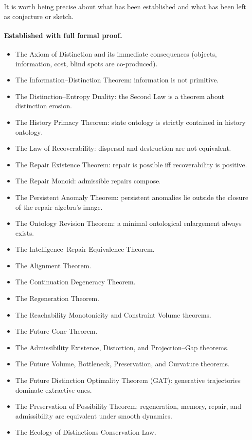\documentclass[12pt,twoside,openright]{book}
\begin{document}
It is worth being precise about what has been established
and what has been left as conjecture or sketch.

\paragraph{Established with full formal proof.}
\begin{itemize}
  \item The Axiom of Distinction and its immediate
        consequences (objects, information, cost, blind
        spots are co-produced).
  \item The Information--Distinction Theorem:
        information is not primitive.
  \item The Distinction--Entropy Duality: the Second Law
        is a theorem about distinction erosion.
  \item The History Primacy Theorem: state ontology is
        strictly contained in history ontology.
  \item The Law of Recoverability: dispersal and
        destruction are not equivalent.
  \item The Repair Existence Theorem: repair is possible
        iff recoverability is positive.
  \item The Repair Monoid: admissible repairs compose.
  \item The Persistent Anomaly Theorem: persistent
        anomalies lie outside the closure of the repair
        algebra's image.
  \item The Ontology Revision Theorem: a minimal
        ontological enlargement always exists.
  \item The Intelligence--Repair Equivalence Theorem.
  \item The Alignment Theorem.
  \item The Continuation Degeneracy Theorem.
  \item The Regeneration Theorem.
  \item The Reachability Monotonicity and
        Constraint Volume theorems.
  \item The Future Cone Theorem.
  \item The Admissibility Existence, Distortion,
        and Projection--Gap theorems.
  \item The Future Volume, Bottleneck, Preservation,
        and Curvature theorems.
  \item The Future Distinction Optimality Theorem
        (GAT): generative trajectories dominate
        extractive ones.
  \item The Preservation of Possibility Theorem:
        regeneration, memory, repair, and admissibility
        are equivalent under smooth dynamics.
  \item The Ecology of Distinctions Conservation Law.
\end{itemize}
\end{document}
